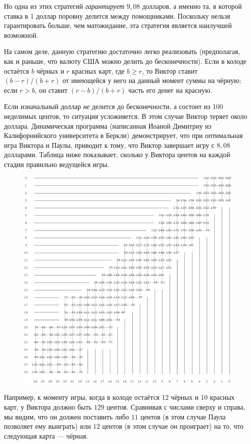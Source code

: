 Но одна из этих стратегий \emph{гарантирует} $9{,}08$ долларов, а именно та, в которой ставка в 1 доллар поровну делится между помощниками.
Поскольку нельзя гарантировать больше, чем матожидание, эта стратегия является наилучшей возможной.\heart

На самом деле, данную стратегию достаточно легко реализовать (предполагая, как и раньше, что валюту США можно делить до бесконечности).
Если в колоде остаётся $b$ чёрных и $r$ красных карт, где $b\ge r$, то Виктор ставит $(b - r)/(b + r)$ от имеющейся у него на данный момент суммы на чёрную; если $r > b$, он ставит $(r - b)/(b + r)$ часть его денег на красную.

\medskip

Если изначальный доллар \emph{не} делится до бесконечности, а состоит из 100 неделимых центов, то ситуация усложняется.
В этом случае Виктор теряет около доллара.
Динамическая программа (написанная Иоаной Димитриу %
из Калифорнийского университета в Беркли) демонстрирует, что при оптимальная игра Виктора и Паулы, приводит к тому, что Виктор завершает игру с $8{,}08$ долларами.
Таблица ниже показывает, сколько у Виктора центов на каждой стадии правильно ведущейся игры.
\begin{figure}[h!]
\centering
\includegraphics[scale=0.63]{Figs/Games/ioana}
\end{figure}
Например, к моменту игры, когда в колоде остаётся 12 чёрных и 10 красных карт, у Виктора должно быть $129$ центов. %
Сравнивая с числами сверху и справа, мы видим, что он должен поставить либо $11$ центов (в этом случае Паула позволяет ему выиграть) или $12$ центов (в этом случае он проиграет) на то, что следующая карта --- чёрная.

